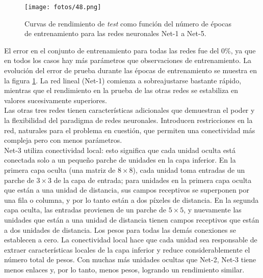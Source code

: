 \begin{figure}[h]
\centering
\texttt{[image: fotos/48.png]}
\caption{Curvas de rendimiento de \textit{test} como función del número de épocas de entrenamiento para las redes neuronales Net-1 a Net-5.}
\label{fig:7.9}
\end{figure}

El error en el conjunto de entrenamiento para todas las redes fue del 0\%, ya que en todos los casos hay más parámetros que observaciones de entrenamiento. La evolución del error de prueba durante las épocas de entrenamiento se muestra en la figura \ref{fig:7.9}. La red lineal (Net-1) comienza a sobreajustarse bastante rápido, mientras que el rendimiento en la prueba de las otras redes se estabiliza en valores sucesivamente superiores. \\

Las otras tres redes tienen características adicionales que demuestran el poder y la flexibilidad del paradigma de redes neuronales. Introducen restricciones en la red, naturales para el problema en cuestión, que permiten una conectividad más compleja pero con menos parámetros. \\

Net-3 utiliza conectividad local: esto significa que cada unidad oculta está conectada solo a un pequeño parche de unidades en la capa inferior. En la primera capa oculta (una matriz de $8 \times 8$), cada unidad toma entradas de un parche de $3 \times 3$ de la capa de entrada; para unidades en la primera capa oculta que están a una unidad de distancia, sus campos receptivos se superponen por una fila o columna, y por lo tanto están a dos píxeles de distancia. En la segunda capa oculta, las entradas provienen de un parche de $5 \times 5$, y nuevamente las unidades que están a una unidad de distancia tienen campos receptivos que están a dos unidades de distancia. Los pesos para todas las demás conexiones se establecen a cero. La conectividad local hace que cada unidad sea responsable de extraer características locales de la capa inferior y reduce considerablemente el número total de pesos. Con muchas más unidades ocultas que Net-2, Net-3 tiene menos enlaces y, por lo tanto, menos pesos, logrando un rendimiento similar. \\

